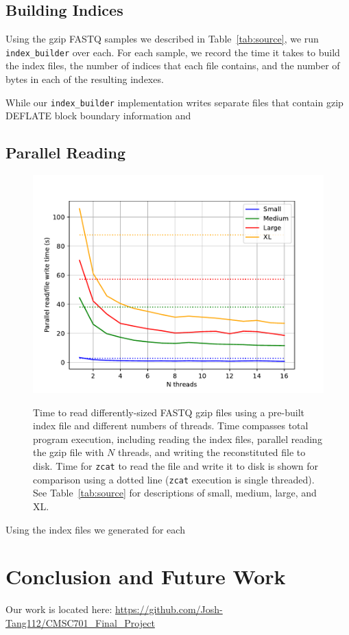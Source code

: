 \documentclass[unnumsec,webpdf,contemporary,large]{oup-authoring-template}
\newcommand{\ibuilder}{\texttt{index\_builder}\xspace}
\newcommand{\gzip}{gzip\xspace}
\begin{document}
\subsection{Building Indices}

Using the \gzip FASTQ samples we described in Table~\ref{tab:source}, we run
\ibuilder over each. For each sample, we record the time it takes to build the
index files, the number of indices that each file contains, and the number of
bytes in each of the resulting indexes. 

While our \ibuilder implementation
writes separate files that contain \gzip DEFLATE block boundary information and



\subsection{Parallel Reading}

\begin{figure}[h]
    \includegraphics[width=\linewidth]{figs/cores.pdf}
    \label{fig:cores}
    \caption{Time to read differently-sized FASTQ \gzip files using a pre-built
    index file and different numbers of threads. Time compasses total program
    execution, including reading the index files, parallel reading the \gzip
    file with $N$ threads, and writing the reconstituted file to disk. Time for
    \texttt{zcat} to read the file and write it to disk is shown for comparison
    using a dotted line (\texttt{zcat} execution is single threaded). See
    Table~\ref{tab:source} for descriptions of small, medium, large, and XL.}
\end{figure}

Using the index files we generated for each 


\section{Conclusion and Future Work}

Our work is located here:
\url{https://github.com/Josh-Tang112/CMSC701_Final_Project}



\end{document}
